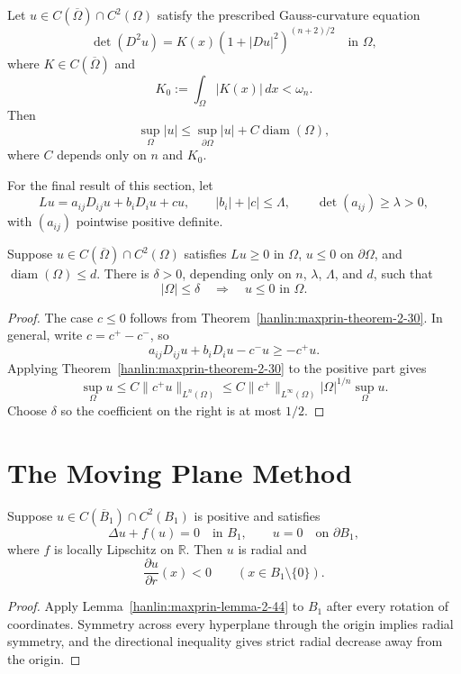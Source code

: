 \begin{corollary}\label{hanlin:maxprin-cor-2-41}
Let $u\in C(\overline\Omega)\cap C^2(\Omega)$ satisfy the prescribed
Gauss-curvature equation
\[
\det(D^2u)=K(x)(1+|Du|^2)^{(n+2)/2}
\quad\text{in }\Omega,
\]
where $K\in C(\overline\Omega)$ and
\[
K_0:=\int_\Omega|K(x)|\,dx<\omega_n.
\]
Then
\[
\sup_\Omega|u|\le\sup_{\partial\Omega}|u|
+C\operatorname{diam}(\Omega),
\]
where $C$ depends only on $n$ and $K_0$.
\end{corollary}

For the final result of this section, let
\[
Lu=a_{ij}D_{ij}u+b_iD_iu+cu,
\qquad
|b_i|+|c|\le\Lambda,
\qquad
\det(a_{ij})\ge\lambda>0,
\]
with $(a_{ij})$ pointwise positive definite.

\begin{theorem}\label{hanlin:maxprin-theorem-2-42}
Suppose $u\in C(\overline\Omega)\cap C^2(\Omega)$ satisfies $Lu\ge0$ in
$\Omega$, $u\le0$ on $\partial\Omega$, and
$\operatorname{diam}(\Omega)\le d$. There is
$\delta>0$, depending only on $n$, $\lambda$, $\Lambda$, and $d$, such that
\[
|\Omega|\le\delta\quad\Longrightarrow\quad u\le0\text{ in }\Omega.
\]
\end{theorem}
\begin{proof}
\sketch The case $c\le0$ follows from
Theorem~\ref{hanlin:maxprin-theorem-2-30}. In general, write $c=c^+-c^-$, so
\[
a_{ij}D_{ij}u+b_iD_iu-c^-u\ge-c^+u.
\]
Applying Theorem~\ref{hanlin:maxprin-theorem-2-30} to the positive part gives
\[
\sup_\Omega u
\le C\|c^+u\|_{L^n(\Omega)}
\le C\|c^+\|_{L^\infty(\Omega)}|\Omega|^{1/n}\sup_\Omega u.
\]
Choose $\delta$ so the coefficient on the right is at most $1/2$.
\end{proof}

\section{The Moving Plane Method}\label{hanlin:maxprin-section-2-6}

\begin{theorem}\label{hanlin:maxprin-theorem-2-43}
Suppose $u\in C(\overline B_1)\cap C^2(B_1)$ is positive and satisfies
\[
\Delta u+f(u)=0\quad\text{in }B_1,
\qquad
u=0\quad\text{on }\partial B_1,
\]
where $f$ is locally Lipschitz on $\mathbb R$. Then $u$ is radial and
\[
\frac{\partial u}{\partial r}(x)<0
\qquad(x\in B_1\setminus\{0\}).
\]
\end{theorem}
\begin{proof}
\sketch Apply Lemma~\ref{hanlin:maxprin-lemma-2-44} to $B_1$ after every
rotation of coordinates. Symmetry across every hyperplane through the origin
implies radial symmetry, and the directional inequality gives strict radial
decrease away from the origin.
\end{proof}

